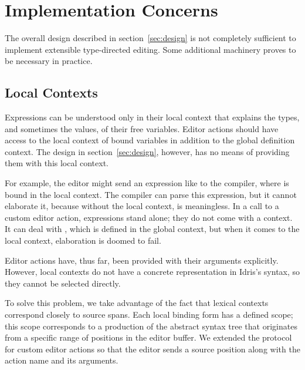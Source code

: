 \section{Implementation Concerns}\label{sec:implementation}


The overall design described in section~\ref{sec:design} is not
completely sufficient to implement extensible type-directed
editing. Some additional machinery proves to be necessary in practice.

\subsection{Local Contexts}

Expressions can be understood only in their local context that
explains the types, and sometimes the values, of their free
variables. Editor actions should have access to the local context of
bound variables in addition to the global definition context. The
design in section~\ref{sec:design}, however, has no means of providing
them with this local context.

For example, the editor might send an expression like  to the compiler, where  is bound in the local context.
The compiler can parse this expression, but it cannot elaborate it,
because without the local context,  is meaningless. In a call to
a custom editor action, expressions stand alone; they do not come with
a context. It can deal with , which is defined in the global
context, but when it comes to the local context, elaboration is doomed
to fail.

Editor actions have, thus far, been provided with their arguments
explicitly. However, local contexts do not have a concrete
representation in Idris's syntax, so they cannot be selected directly.

To solve this problem, we take advantage of the fact that lexical
contexts correspond closely to source spans. Each local binding form
has a defined scope; this scope corresponds to a production of the
abstract syntax tree that originates from a specific range of
positions in the editor buffer. We extended the protocol for custom
editor actions so that the editor sends a source position along with
the action name and its arguments.

